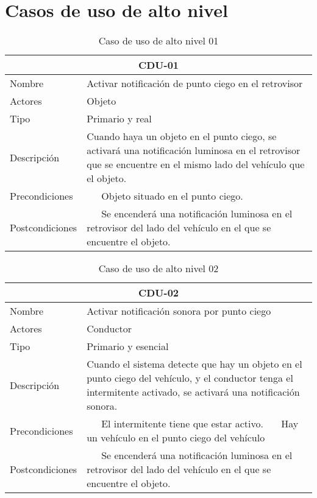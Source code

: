 \newcommand{\tabitem}{~\llap{-}~~}

\section{Casos de uso de alto nivel}

\begin{table}[H]
\begin{center}
\begin{tabular}{p{} p{11cm}}
\multicolumn{2}{c}{\textbf{CDU-01} } \\ \hline \hline
Nombre & Activar notificación de punto ciego en el retrovisor \\ \hline
Actores & Objeto \\ \hline
Tipo & Primario y real \\ \hline
Descripción & Cuando haya un objeto en el punto ciego, se activará una notificación luminosa en el retrovisor que se encuentre en el mismo lado del vehículo que el objeto.  \\ \hline
Precondiciones &  \tabitem Objeto situado en el punto ciego. \\ \hline
Postcondiciones & \tabitem Se encenderá una notificación luminosa en el retrovisor del lado del vehículo en el que se encuentre el objeto. \\ \hline
\end{tabular}
\caption{Caso de uso de alto nivel 01}
\label{tab:CDU-01}
\end{center}
\end{table}

\begin{table}[H]
\begin{center}
\begin{tabular}{p{} p{11cm}}
\multicolumn{2}{c}{\textbf{CDU-02} } \\ \hline \hline
Nombre & Activar notificación sonora por punto ciego
 \\ \hline
Actores & Conductor \\ \hline
Tipo & Primario y esencial \\ \hline
Descripción & Cuando el sistema detecte que hay un objeto en el punto ciego del vehículo, y el conductor tenga el intermitente activado, se activará una notificación sonora. \\ \hline
Precondiciones &  \tabitem El intermitente tiene que estar activo. \newline \tabitem Hay un vehículo en el punto ciego del vehículo \\ \hline
Postcondiciones & \tabitem Se encenderá una notificación luminosa en el retrovisor del lado del vehículo en el que se encuentre el objeto. \\ \hline
\end{tabular}
\caption{Caso de uso de alto nivel 02}
\label{tab:CDU-02}
\end{center}
\end{table}

